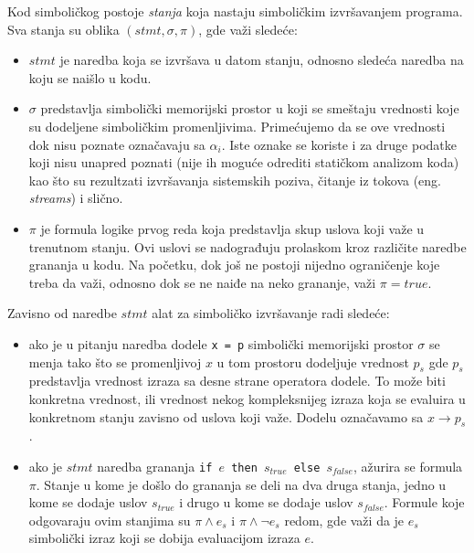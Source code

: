 \documentclass[12pt,oneside]{memoir}
\begin{document}
Kod simboličkog postoje \textit{stanja} koja nastaju simboličkim izvršavanjem programa. Sva stanja su oblika $(stmt, \sigma, \pi)$, gde važi sledeće:

\begin{itemize}
    \item $stmt$ je naredba koja se izvršava u datom stanju, odnosno sledeća naredba na koju se naišlo u kodu.
    \item $\sigma$ predstavlja simbolički memorijski prostor u koji se smeštaju vrednosti koje su dodeljene simboličkim promenljivima. Primećujemo da se ove vrednosti dok nisu poznate označavaju sa $\alpha_i$. Iste oznake se koriste i za druge podatke koji nisu unapred poznati (nije ih moguće odrediti statičkom analizom koda) kao što su rezultzati izvršavanja sistemskih poziva, čitanje iz tokova (eng. \textit{streams}) i slično.
    
    \item $\pi$ je formula logike prvog reda koja predstavlja skup uslova koji važe u trenutnom stanju. Ovi uslovi se nadograđuju prolaskom kroz različite naredbe grananja u kodu. Na početku, dok još ne postoji nijedno ograničenje koje treba da važi, odnosno dok se ne naiđe na neko grananje, važi $\pi = true$. 
\end{itemize}

Zavisno od naredbe $stmt$ alat za simboličko izvršavanje radi sledeće:

\begin{itemize}
    \item ako je u pitanju naredba dodele \texttt{x = p} simbolički memorijski prostor $\sigma$ se menja tako što se promenljivoj $x$ u tom prostoru dodeljuje vrednost $p_s$ gde $p_s$ predstavlja vrednost izraza sa desne strane operatora dodele. To može biti konkretna vrednost, ili vrednost nekog kompleksnijeg izraza koja se evaluira u konkretnom stanju zavisno od uslova koji važe. Dodelu označavamo sa $x \rightarrow p_s$.
    
    \item ako je $stmt$ naredba grananja \texttt{if $e$ then $s_{true}$ else $s_{false}$}, ažurira se formula $\pi$. Stanje u kome je došlo do grananja se deli na dva druga stanja, jedno u kome se dodaje uslov $s_{true}$ i drugo u kome se dodaje uslov $s_{false}$. Formule koje odgovaraju ovim stanjima su $\pi \land e_s$ i $\pi \land \neg e_s$ redom, gde važi da je $e_s$ simbolički izraz koji se dobija evaluacijom izraza $e$.
\end{itemize}
\end{document}
